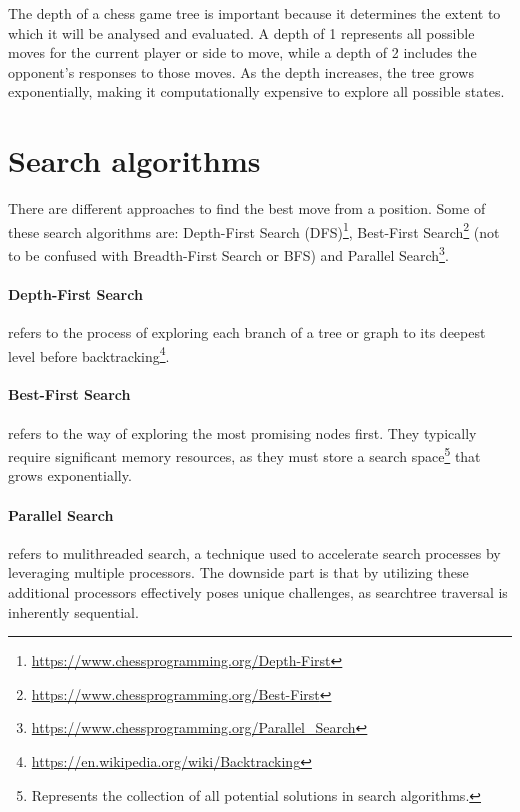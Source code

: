 \vspace{1em}

The depth of a chess game tree is important because it determines the extent to which it will be analysed and evaluated. A depth of 1 represents all possible moves for the current player or side to move, while a depth of 2 includes the opponent's responses to those moves. As the depth increases, the tree grows exponentially, making it computationally expensive to explore all possible states.

\section{Search algorithms}

There are different approaches to find the best move from a position. Some of these search algorithms are: Depth-First Search (DFS)\footnote{\url{https://www.chessprogramming.org/Depth-First}}, Best-First Search\footnote{\url{https://www.chessprogramming.org/Best-First}} (not to be confused with Breadth-First Search or BFS) and Parallel Search\footnote{\url{https://www.chessprogramming.org/Parallel_Search}}.

\paragraph{Depth-First Search} refers to the process of exploring each branch of a tree or graph to its deepest level before backtracking\footnote{\url{https://en.wikipedia.org/wiki/Backtracking}}.

\paragraph{Best-First Search} refers to the way of exploring the most promising nodes first. They typically require significant memory resources, as they must store a search space\footnote{Represents the collection of all potential solutions in search algorithms.} that grows exponentially.

\paragraph{Parallel Search} refers to mulithreaded search, a technique used to accelerate search processes by leveraging multiple processors. The downside part is that by utilizing these additional processors effectively poses unique challenges, as searchtree traversal is inherently sequential.

